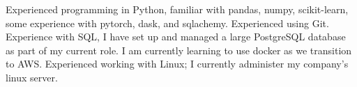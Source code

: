 \documentclass[a4paper]{article}
\begin{document}
Experienced programming in Python, familiar with pandas, numpy, scikit-learn, some experience with pytorch, dask, and sqlachemy. Experienced using Git. Experience with SQL, I have set up and managed a large PostgreSQL database as part of my current role. I am currently learning to use docker as we transition to AWS. Experienced working with Linux; I currently administer my company's linux server.

%
%
%
%
%
%
%
%
\end{document}
